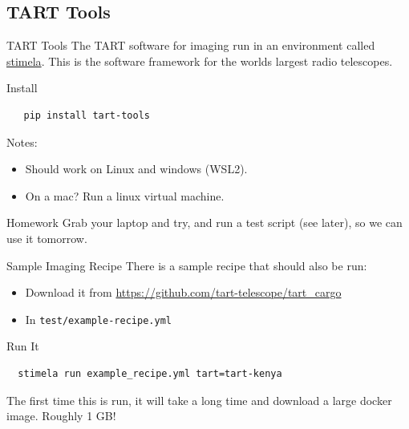 \documentclass[ignorenonframetext]{beamer}
\begin{document}
\subsection{TART Tools}

\begin{frame}[fragile]{TART Tools}
  The TART software for imaging run in an environment called \href{https://github.com/caracal-pipeline/stimela}{stimela}. This is the software framework for the worlds largest radio telescopes.

  \begin{block}{Install}
  \begin{verbatim}
   pip install tart-tools
  \end{verbatim}
  \end{block}

  Notes:
  \begin{itemize}
   \item Should work on Linux and windows (WSL2).
   \item On a mac? Run a linux virtual machine.
  \end{itemize}
   \begin{block}{Homework}
   Grab your laptop and try, and run a test script (see later), so we can use it tomorrow.
   \end{block}

\end{frame}


\begin{frame}[fragile]{Sample Imaging Recipe}
There is a sample recipe that should also be run:
\begin{itemize}
 \item Download it from \url{https://github.com/tart-telescope/tart_cargo}
 \item In \verb!test/example-recipe.yml!
\end{itemize}
\begin{block}{Run It}
 \begin{verbatim}
  stimela run example_recipe.yml tart=tart-kenya
 \end{verbatim}
\end{block}
 The first time this is run, it will take a long time and download a large docker image. Roughly 1 GB!
\end{frame}
\end{document}
